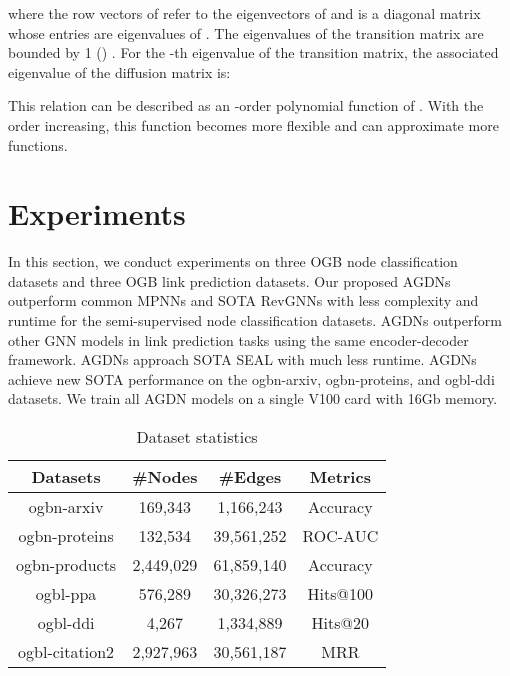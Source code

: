 \documentclass{article}
\begin{document}
where the row vectors of  refer to the eigenvectors of  and  is a diagonal matrix whose entries  are eigenvalues of . The eigenvalues of the transition matrix are bounded by 1 () \cite{ng2001spectral}.
For the -th eigenvalue  of the transition matrix, the associated eigenvalue  of the diffusion matrix is:

This relation can be described as an -order polynomial function of . With the order increasing, this function becomes more flexible and can approximate more functions. 

\section{Experiments}
In this section, we conduct experiments on three OGB node classification datasets and three OGB link prediction datasets. Our proposed AGDNs outperform common MPNNs and SOTA RevGNNs with less complexity and runtime for the semi-supervised node classification datasets. AGDNs outperform other GNN models in link prediction tasks using the same encoder-decoder framework. AGDNs approach SOTA SEAL with much less runtime. AGDNs achieve new SOTA performance on the ogbn-arxiv, ogbn-proteins, and ogbl-ddi datasets. We train all AGDN models on a single V100 card with 16Gb memory.

\begin{table}[htb]
    \caption{Dataset statistics}
\begin{center}
    \begin{tabular}{c|ccc}
    \toprule[1pt]
         \textbf{Datasets} & \textbf{\#Nodes} & \textbf{\#Edges} & \textbf{Metrics}  \\
         \midrule
         ogbn-arxiv & 169,343 & 1,166,243 & Accuracy \\
         ogbn-proteins & 132,534 & 39,561,252 & ROC-AUC \\
         ogbn-products & 2,449,029 & 61,859,140 & Accuracy \\
         \midrule
         ogbl-ppa & 576,289 & 30,326,273 & Hits@100 \\
         ogbl-ddi & 4,267 & 1,334,889 & Hits@20 \\
         ogbl-citation2 & 2,927,963 & 30,561,187 & MRR \\
    \bottomrule[1pt]
    \end{tabular}
\end{center}
    \label{tab:dataset statistics}
\end{table}
\end{document}
